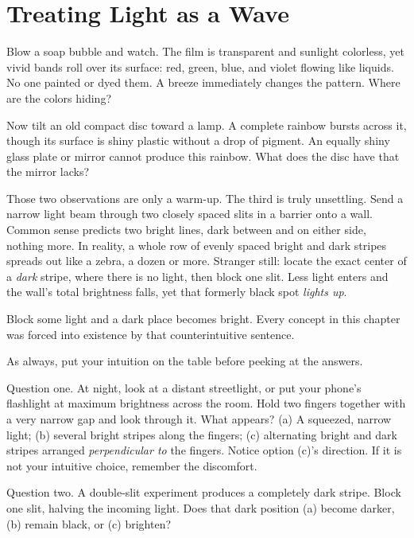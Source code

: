 \chapter{Treating Light as a Wave}


\begin{mainline}
Blow a soap bubble and watch. The film is transparent and sunlight colorless, yet vivid bands roll over its surface: red, green, blue, and violet flowing like liquids. No one painted or dyed them. A breeze immediately changes the pattern. Where are the colors hiding?

Now tilt an old compact disc toward a lamp. A complete rainbow bursts across it, though its surface is shiny plastic without a drop of pigment. An equally shiny glass plate or mirror cannot produce this rainbow. What does the disc have that the mirror lacks?

Those two observations are only a warm-up. The third is truly unsettling. Send a narrow light beam through two closely spaced slits in a barrier onto a wall. Common sense predicts two bright lines, dark between and on either side, nothing more. In reality, a whole row of evenly spaced bright and dark stripes spreads out like a zebra, a dozen or more. Stranger still: locate the exact center of a \emph{dark} stripe, where there is no light, then block one slit. Less light enters and the wall's total brightness falls, yet that formerly black spot \emph{lights up}.

Block some light and a dark place becomes bright. Every concept in this chapter was forced into existence by that counterintuitive sentence.
\end{mainline}


As always, put your intuition on the table before peeking at the answers.

Question one. At night, look at a distant streetlight, or put your phone's flashlight at maximum brightness across the room. Hold two fingers together with a very narrow gap and look through it. What appears? (a) A squeezed, narrow light; (b) several bright stripes along the fingers; (c) alternating bright and dark stripes arranged \emph{perpendicular to} the fingers. Notice option (c)'s direction. If it is not your intuitive choice, remember the discomfort.

Question two. A double-slit experiment produces a completely dark stripe. Block one slit, halving the incoming light. Does that dark position (a) become darker, (b) remain black, or (c) brighten?

